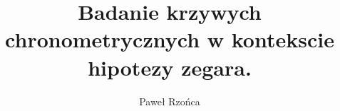 \title{Badanie krzywych chronometrycznych w kontekscie hipotezy zegara.}
\author{Paweł Rzońca}
\graphicspath{{/home/galeon/Labor/czas/main/images/}}

\renewcommand{\figurename}{Rys.}
\renewcommand{\tablename}{Tab.}
\renewcommand{\abstractname}{Abstrakt}


\renewcommand{\d}{\text{d}}
\newcommand{\D}{\text{D}}


\theoremstyle{definition}
\newtheorem{definition}{Definicja}

\theoremstyle{theorem}
\newtheorem{theorem}{Twierdzenie}
